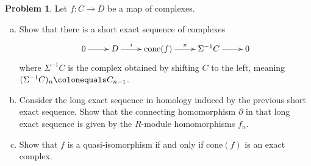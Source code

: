 \documentclass[11pt]{article}
\theoremstyle{definition}
\newtheorem{problem}{Problem}
\begin{document}
\begin{problem} Let $f\!: C \longrightarrow D$ be a map of complexes.
	\begin{enumerate}[a)]
		\item Show that there is a short exact sequence of complexes
		$$\xymatrix{0 \ar[r] & D \ar[r]^-i & \textrm{cone}(f) \ar[r]^-{\pi} & \Sigma^{-1} C \ar[r] & 0}$$
		where $\Sigma^{-1} C$ is the complex obtained by shifting $C$ to the left, meaning $(\Sigma^{-1} C)_n \colonequals C_{n-1}$.
		\item Consider the long exact sequence in homology induced by the previous short exact sequence. Show that the connecting homomorphism $\partial$ in that long exact sequence is given by the $R$-module homomorphisms $f_n$.
		\item Show that $f$ is a quasi-isomorphism if and only if $\textrm{cone}(f)$ is an exact complex.
	\end{enumerate}
\end{problem}

\
\end{document}

